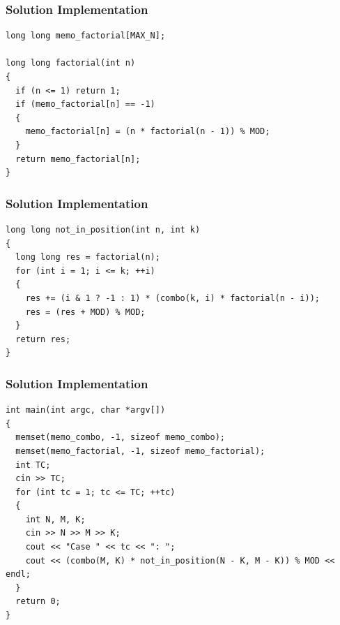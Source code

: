 \documentclass{beamer}
\begin{document}
\begin{frame}[containsverbatim]
\frametitle{Solution Implementation}
\scriptsize

\begin{lstlisting}
long long memo_factorial[MAX_N];

long long factorial(int n)
{
  if (n <= 1) return 1;
  if (memo_factorial[n] == -1)
  {
    memo_factorial[n] = (n * factorial(n - 1)) % MOD;
  }
  return memo_factorial[n];
}
\end{lstlisting}

\end{frame}

\begin{frame}[containsverbatim]
\frametitle{Solution Implementation}
\scriptsize

\begin{lstlisting}
long long not_in_position(int n, int k)
{
  long long res = factorial(n);
  for (int i = 1; i <= k; ++i)
  {
    res += (i & 1 ? -1 : 1) * (combo(k, i) * factorial(n - i));
    res = (res + MOD) % MOD;
  }
  return res;
}
\end{lstlisting}

\end{frame}

\begin{frame}[containsverbatim]
\frametitle{Solution Implementation}
\scriptsize

\begin{lstlisting}
int main(int argc, char *argv[])
{
  memset(memo_combo, -1, sizeof memo_combo);
  memset(memo_factorial, -1, sizeof memo_factorial);
  int TC;
  cin >> TC;
  for (int tc = 1; tc <= TC; ++tc)
  {
    int N, M, K;
    cin >> N >> M >> K;
    cout << "Case " << tc << ": ";
    cout << (combo(M, K) * not_in_position(N - K, M - K)) % MOD << endl;
  }
  return 0;
}
\end{lstlisting}

\end{frame}

\fi
\end{document}
